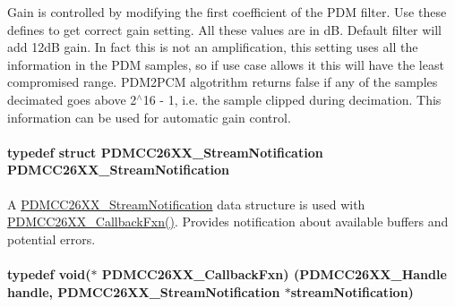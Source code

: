 Gain is controlled by modifying the first coefficient of the P\+D\+M filter. Use these defines to get correct gain setting. All these values are in d\+B. Default filter will add 12d\+B gain. In fact this is not an amplification, this setting uses all the information in the P\+D\+M samples, so if use case allows it this will have the least compromised range. P\+D\+M2\+P\+C\+M algotrithm returns false if any of the samples decimated goes above 2$^\wedge$16 -\/ 1, i.\+e. the sample clipped during decimation. This information can be used for automatic gain control. 
\paragraph[{P\+D\+M\+C\+C26\+X\+X\+\_\+\+Stream\+Notification}]{\setlength{\rightskip}{0pt plus 5cm}typedef struct {\bf P\+D\+M\+C\+C26\+X\+X\+\_\+\+Stream\+Notification}  {\bf P\+D\+M\+C\+C26\+X\+X\+\_\+\+Stream\+Notification}}\label{_p_d_m_c_c26_x_x_8h_abebd17c183efa14ae0ebe9c229f6c577}


A \hyperlink{struct_p_d_m_c_c26_x_x___stream_notification}{P\+D\+M\+C\+C26\+X\+X\+\_\+\+Stream\+Notification} data structure is used with \hyperlink{_p_d_m_c_c26_x_x_8h_ab6fdee59a79029e938e3fbf0e446fa91}{P\+D\+M\+C\+C26\+X\+X\+\_\+\+Callback\+Fxn()}. Provides notification about available buffers and potential errors. 

\paragraph[{P\+D\+M\+C\+C26\+X\+X\+\_\+\+Callback\+Fxn}]{\setlength{\rightskip}{0pt plus 5cm}typedef void($\ast$ P\+D\+M\+C\+C26\+X\+X\+\_\+\+Callback\+Fxn) ({\bf P\+D\+M\+C\+C26\+X\+X\+\_\+\+Handle} handle, {\bf P\+D\+M\+C\+C26\+X\+X\+\_\+\+Stream\+Notification} $\ast$stream\+Notification)}\label{_p_d_m_c_c26_x_x_8h_ab6fdee59a79029e938e3fbf0e446fa91}



